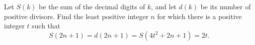 Let $S(k)$ be the sum of the decimal digits of $k$, and let $d(k)$ be its number of positive divisors. Find the least positive integer $n$ for which there is a positive integer $t$ such that \[S(2n+1)=d(2n+1)=S(4t^2+2n+1)=2t.\]
